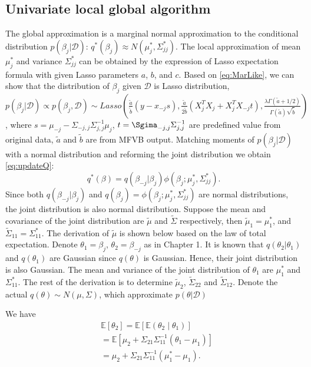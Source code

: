 \subsection{Univariate local global algorithm}
The global approximation is a marginal normal approximation to the conditional distribution $p(\beta_j|\mathcal{D})$: $q^*(\beta_j) \approx N(\mu_j^*,\Sigma_{jj}^*)$. The local approximation of mean $\mu_j^*$ and variance $\Sigma_{jj}^*$ can be obtained by the expression of Lasso expectation formula with given Lasso parameters $a$, $b$, and $c$. Based on \autoref{eq:MarLike}, we can show that the distribution of $\beta_j$ given $\mathcal{D}$ is Lasso distribution, $p(\beta_j|\mathcal{D}) \propto p(\beta_j,\mathcal{D}) \sim Lasso\left(\frac{\tilde{a}}{\tilde{b}}(y - x_{-j}s), \frac{\tilde{a}}{2\tilde{b}}(X_j^TX_j+X_j^TX_{-j}t) , \frac{\lambda \Gamma(\tilde{a}+1/2)}{\Gamma(\tilde{a})\sqrt{\tilde{b}  }}\right) $, where $s = \mu_{-j} - \Sigma_{-j,j}\Sigma_{j,j}^{-1}\mu_j$, $t = \Sgima_{-j,j}\Sigma_{j,j}^{-1}$ are predefined value from original data, $\tilde{a}$ and $\tilde{b}$ are from MFVB output. 
Matching moments of $p(\beta_j|\mathcal{D})$ with a normal distribution and reforming the joint distribution we obtain
\autoref{eq:updateQ}:
\begin{equation}
	\label{eq:updateQ}
	q^*(\beta) = q(\beta_{-j}|\beta_j)\phi(\beta_j;\mu_j^*,\Sigma_{jj}^*).
\end{equation} 
Since both $q(\beta_{-j}|\beta_j)$ and $q(\beta_j)= \phi(\beta_j;\mu_j^*,\Sigma_{jj}^*)$ are normal distributions, the joint distribution is also normal distribution. Suppose the mean and covariance of the joint distribution
are $\widetilde{\mu}$ and $\widetilde{\Sigma}$ respectively, then $\widetilde{\mu}_1 = \mu_1^*$, and $\widetilde{\Sigma}_{11} = \Sigma_{11}^*$. The derivation of $\tilde{\mu}$ is shown below based on the law of total expectation.
Denote $\theta_1 = \beta_j$, $\theta_2 = \beta_{-j}$ as in Chapter 1. It is known that $q(\theta_2|\theta_1)$ and $q(\theta_1)$ are Gaussian since $q(\theta)$ is Gaussian. Hence, their joint distribution is also Gaussian. The 
mean and variance of the joint distribution of $\theta_1$ are $\mu_1^*$
and $\Sigma_{11}^*$. 
The rest of the derivation is to determine $\widetilde{\mu}_{2}$, $\widetilde{\Sigma}_{22}$
and $\widetilde{\Sigma}_{12}$. Denote the actual $q(\theta) \sim N(\mu,\Sigma)$, which approximate $p(\theta|\mathcal{D})$

\bigskip 
\noindent We have
$$
\begin{array}{rl}
	& \mathbb{E}[\theta_2] = \mathbb{E}[\mathbb{E}(\theta_2\mid\theta_1)] 
	\\ [1ex]
	&  = \mathbb{E}[\mu_2 + \Sigma_{21}\Sigma_{11}^{-1}\left(\theta_1 - \mu_1\right)]
	\\ [1ex]
	& = \mu_2 + \Sigma_{21}\Sigma_{11}^{-1}\left(\mu_1^* - \mu_1\right).
\end{array} 
$$

